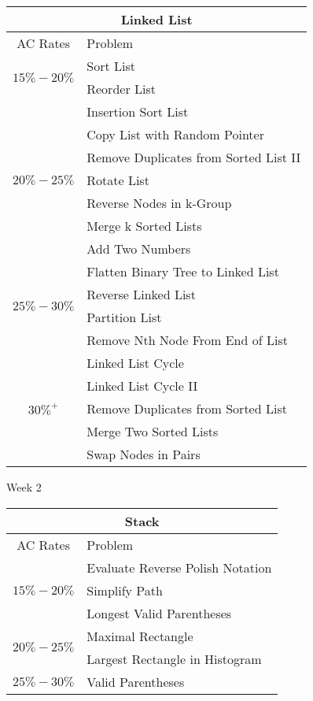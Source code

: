 \documentclass[paper=a4, fontsize=11pt]{scrartcl} %
\begin{document}
\begin{center}
  \begin{tabular}{|c|l|}
      \hline
      \multicolumn{2}{|c|}{Linked List} \\
      \hline
      AC Rates      &   Problem     \\
      \hline
      \multirow{2}{*}{$15\%-20\%$}  &   Sort List    \\
          & Reorder List    \\
      \hline
      \multirow{7}{*}{$20\%-25\%$}  &   Insertion Sort List    \\
          & Copy List with Random Pointer    \\
          & Remove Duplicates from Sorted List II \\
          & Rotate List \\
          & Reverse Nodes in k-Group    \\
          & Merge k Sorted Lists \\
          & Add Two Numbers \\
      \hline
      \multirow{4}{*}{$25\%-30\%$}  &   Flatten Binary Tree to Linked List    \\
          & Reverse Linked List \\
          & Partition List  \\
          & Remove Nth Node From End of List \\
      \hline
      \multirow{5}{*}{$30\%^+$}  &   Linked List Cycle    \\
          & Linked List Cycle II    \\
          & Remove Duplicates from Sorted List \\
          & Merge Two Sorted Lists \\
          & Swap Nodes in Pairs \\
      \hline
  \end{tabular}

  \pagebreak

  \begin{center}
    Week 2
  \end{center}

  \begin{tabular}{|c|l|}
      \hline
      \multicolumn{2}{|c|}{Stack} \\
      \hline
      AC Rates      &   Problem     \\
      \hline
      \multirow{3}{*}{$15\%-20\%$}  &    Evaluate Reverse Polish Notation    \\
          & Simplify Path    \\
          & Longest Valid Parentheses    \\
      \hline
      \multirow{2}{*}{$20\%-25\%$}  &   Maximal Rectangle    \\
          & Largest Rectangle in Histogram    \\
      \hline
      \multirow{1}{*}{$25\%-30\%$}  &   Valid Parentheses \\
      \hline
  \end{tabular}


\end{center}
\end{document}
